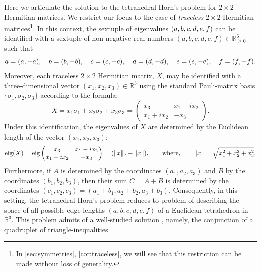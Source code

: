 \documentclass[notitlepage, 10pt]{article}
\begin{document}
\begin{exam}[Tetrahedral Horn's problem for \texorpdfstring{$d=2$}{d=2}]
    \label{exam:d_2}
    Here we articulate the solution to the tetrahedral Horn's problem for $2\times 2$ Hermitian matrices.
    We restrict our focus to the case of \textit{traceless} $2 \times 2$ Hermitian matrices\footnote{In \cref{sec:symmetries}, \cref{cor:traceless}, we will see that this restriction can be made without loss of generality.}.
    In this context, the sextuple of eigenvalues $(a,b,c,d,e,f)$ can be identified with a sextuple of non-negative real numbers $(a,b,c,d,e,f) \in \mathbb R_{\geq 0}^{6}$ such that
    \begin{equation}
        \label{eq:traceless_two_dim_tetra}
        a = (a, -a), \quad
        b = (b, -b), \quad
        c = (c, -c), \quad
        d = (d, -d), \quad
        e = (e, -e), \quad
        f = (f, -f).
    \end{equation}
    Moreover, each traceless $2 \times 2$ Hermitian matrix, $X$, may be identified with a three-dimensional vector $(x_1, x_2, x_3) \in \mathbb R^{3}$ using the standard Pauli-matrix basis $\{\sigma_1, \sigma_2, \sigma_3\}$ according to the formula:
    \begin{equation}
        X = x_1 \sigma_1 + x_2 \sigma_2 + x_3 \sigma_3 = \begin{pmatrix} x_3 & x_1-ix_2 \\ x_1+ix_2 & -x_3 \end{pmatrix}.
    \end{equation}
    Under this identification, the eigenvalues of $X$ are determined by the Euclidean length of the vector $(x_1, x_2, x_3)$:
    \begin{equation}
        \operatorname{eig}(X) = \operatorname{eig}\begin{pmatrix} x_3 & x_1-ix_2 \\ x_1+ix_2 & -x_3 \end{pmatrix} = (\left\lVert x\right\rVert, -\left\lVert x\right\rVert), \qquad \text{where}, \qquad \left\lVert x\right\rVert = \sqrt{x_1^2 + x_2^2 + x_3^2}.
    \end{equation}
    Furthermore, if $A$ is determined by the coordinates $(a_1,a_2,a_3)$ and $B$ by the coordinates $(b_1,b_2,b_3)$, then their sum $C=A+B$ is determined by the coordinates $(c_1, c_2, c_3) = (a_1 + b_1, a_2 + b_2, a_3 + b_3)$.
    Consequently, in this setting, the tetrahedral Horn's problem reduces to problem of describing the space of all possible edge-lengths $(a,b,c,d,e,f)$ of a Euclidean tetrahedron in $\mathbb R^{3}$. 
    This problem admits of a well-studied solution \cite{richardson1902trigonometry,wirth2009edge}, namely, the conjunction of a quadruplet of triangle-inequalities


\end{exam}
\end{document}
